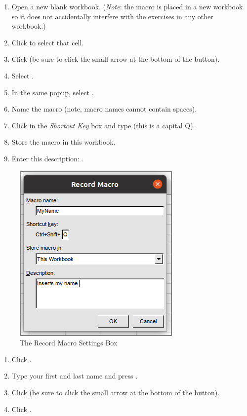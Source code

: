 \begin{enumerate}
	\item Open a new blank workbook. (\textit{Note}: the macro is placed in a new workbook so it does not accidentally interfere with the exercises in any other workbook.)
	\item Click  to select that cell.
	\item Click  (be sure to click the small arrow at the bottom of the  button).
	\item Select .
	\item In the same popup, select .
	\item Name the macro  (note, macro names cannot contain spaces).
	\item Click in the \textit{Shortcut Key} box and type  (this is a capital Q). 
	\item Store the macro in this workbook.
	\item Enter this description: .
\end{enumerate}

\begin{figure}[H]
	\centering
	\includegraphics[width=\maxwidth{.75\linewidth}]{gfx/ch09_fig65}
	\caption{The Record Macro Settings Box}
	\label{09:fig65}
\end{figure}

\begin{enumerate}[resume]	
	\item Click .
	\item Type your first and last name and press .
	\item Click  (be sure to click the small arrow at the bottom of the  button).
	\item Click .
\end{enumerate}

